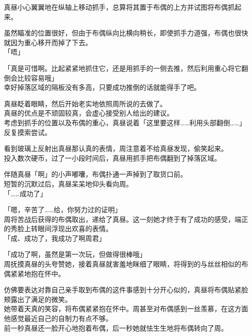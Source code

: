 真昼小心翼翼地在纵轴上移动抓手，总算将其置于布偶的上方并试图将布偶抓起来。

虽然瞄准的位置很好，但由于布偶纵向比横向稍长，即使抓手力道强，布偶也很快就因为重心移开而掉了下去。\\

「唔」

「真是可惜啊。比起紧紧地抓住它，还是用抓手的一侧去推，然后利用重心将它翻倒会比较容易哦」\\

幸好掉落区域的隔板没有多高，只要成功推倒的话就能得手了吧。

真昼眨着眼睛，然后开始老实地依照周所说的去做了。\\

真昼的优点是不顽固较真，会虚心接受别人给出的建议。\\

考虑到抓手的位置以及布偶的重心，真昼说着「这里要这样……利用头部翻倒……」反复摸索尝试。

看到玻璃上反射出真昼那认真的表情，周注意着不给真昼发现，偷笑起来。\\

投入数次硬币，过了一小段时间后，真昼用抓手把布偶翻到了掉落区域。

伴随真昼「啊」的小声嘟囔，布偶扑通一声掉到了取货口前。\\

短暂的沉默过后，真昼呆呆地仰头看向周。\\

「……成功了」

「嗯，辛苦了……给，你努力过的证明」\\

周将苦战后获得的布偶取出，递给了真昼。这一刻她才终于有了成功的感受，端正的秀脸上转眼间浮现出欢喜的表情。\\

「成、成功了，我成功了啊周君」

「成功了啊，虽然是第一次玩，但做得很棒哦」\\

周抚摸真昼的头夸赞她，接着真昼就害羞地眯细了眼睛，将得到的与丝丝相似的布偶紧紧地抱在怀中。

仿佛要表达对靠自己亲手取到布偶的这件事感到十分开心似的，真昼将布偶贴紧脸颊露出了满足的微笑。\\

她带着天真的笑容，将布偶紧紧抱在怀中。周甚至对布偶感到一丝羡慕，在这方面他感觉最近自己的自制力有点不够。\\

前一秒真昼还一脸开心地抱着布偶，后一秒她就怯生生地将布偶转向了周。\\

